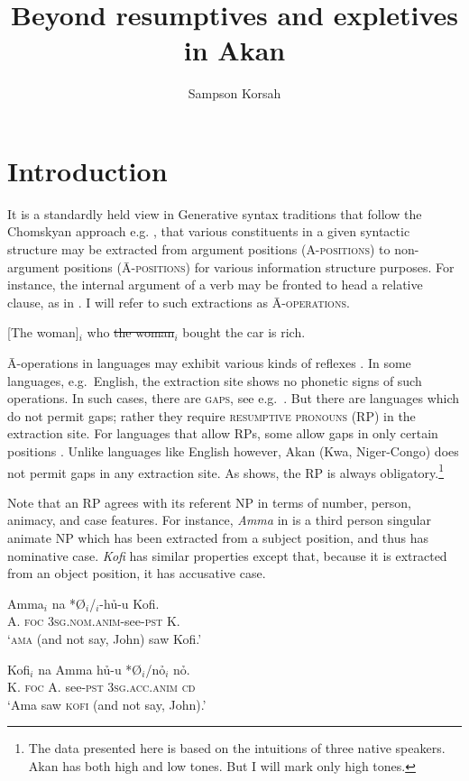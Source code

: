 \documentclass[output=paper]{LSP/langsci}
\author{Sampson Korsah \affiliation{Universit\"at Leipzig}}
\title{Beyond resumptives and expletives in {A}kan}
\begin{document}
\section{Introduction} 
It is a standardly held view in Generative syntax traditions that follow the Chomskyan approach e.g. \cite{Chomsky81}, that various constituents in a given syntactic structure may be extracted from argument positions (\textsc{A-positions}) to non-argument positions (\textsc{\=A-positions})  for various information structure purposes. For instance, the internal argument of a verb may be fronted to head a  relative clause, as in   . I will refer to such extractions as \textsc{\=A-operations}.

\ea\label{ex:korsah:1}
[The woman]$_i$ who \sout{the woman}$_i$ bought the car is rich.
\z

\=A-operations in languages may exhibit various kinds of reflexes \citep{Georgi14}. In some languages, e.g.\ English, the extraction site shows no phonetic signs of such operations. In such cases, there are \textsc{gaps}, see e.g.\ \cite{Salzmann11}.
But there are languages which do not permit gaps; rather they require \textsc{resumptive pronouns} (RP) in the extraction site. For languages that allow RPs, some allow gaps in only certain positions \citep[see][]{Klein14}.
Unlike languages like English however,  Akan (Kwa, Niger-Congo) does not permit gaps in any extraction site. As  shows, the RP is always obligatory.\footnote{The data presented here is based on the intuitions of three native speakers. Akan has both high and low tones. But I will mark only high tones.} 

Note that an RP agrees with its referent NP in terms of number, person, animacy, and case features. For instance, \textit{Amma} in  is a third person singular animate NP which has been extracted from a subject position, and thus has nominative case. \textit{Kofi}  has similar properties except that, because it is extracted from an object position, it has accusative case. 
   
\ea\label{ex:korsah:2}
\ea\label{ex:korsah:2a}
\gll Amma$_i$ na  *\O $_i$/\oor$_i$-h\h u-u Kofi. \\
A. \textsc{foc} \textsc{3sg.nom.anim-}see\textsc{-pst} K. \\
\glt  `\textsc{ama}  (and not say, John) saw Kofi.'

\ex \label{ex:korsah:2b}
\gll Kofi$_i$  na Amma h\h u-u *\O $_i$/n\h o$_i$  n\h o. \\
K. \textsc{foc} A. see\textsc{-pst} \textsc{3sg.acc.anim} \textsc{cd} \\
\glt  `Ama saw \textsc{kofi} (and not say, John).'
\z
\z   
   
\end{document}
